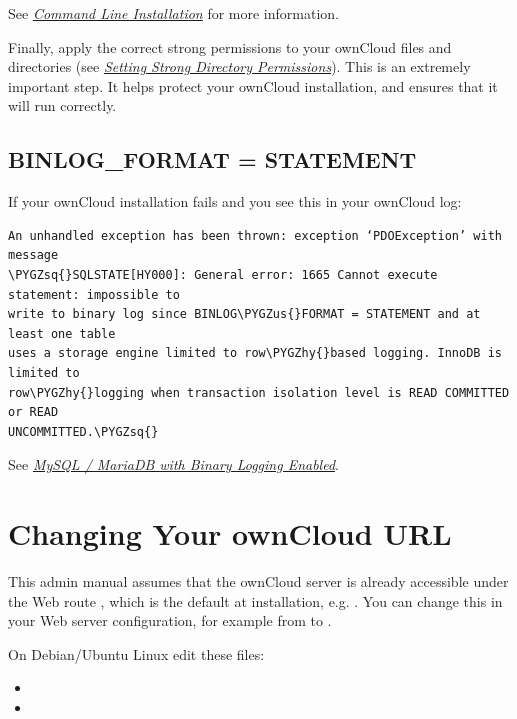\documentclass[letterpaper,10pt,english]{sphinxmanual}
\def\PYGZus{\char`\_}
\def\PYGZhy{\char`\-}
\def\PYGZsq{\char`\'}
\renewcommand\PYGZsq{\textquotesingle}
\begin{document}
See {\hyperref[configuration_server/occ_command:command\string-line\string-installation\string-label]{\emph{Command Line Installation}}} for more information.

Finally, apply the correct strong permissions to your ownCloud files and
directories (see {\hyperref[installation/installation_wizard:strong\string-perms\string-label]{\emph{Setting Strong Directory Permissions}}}). This is an extremely important
step. It helps protect your ownCloud installation, and ensures that it will run
correctly.


\subsection{BINLOG\_FORMAT = STATEMENT}
\label{installation/command_line_installation:binlog-format-statement}
If your ownCloud installation fails and you see this in your ownCloud log:

\begin{Verbatim}[commandchars=\\\{\}]
An unhandled exception has been thrown: exception ‘PDOException’ with message
\PYGZsq{}SQLSTATE[HY000]: General error: 1665 Cannot execute statement: impossible to
write to binary log since BINLOG\PYGZus{}FORMAT = STATEMENT and at least one table
uses a storage engine limited to row\PYGZhy{}based logging. InnoDB is limited to
row\PYGZhy{}logging when transaction isolation level is READ COMMITTED or READ
UNCOMMITTED.\PYGZsq{}
\end{Verbatim}

See {\hyperref[configuration_database/linux_database_configuration:db\string-binlog\string-label]{\emph{MySQL / MariaDB with Binary Logging Enabled}}}.


\section{Changing Your ownCloud URL}
\label{installation/changing_the_web_route::doc}\label{installation/changing_the_web_route:changing-your-owncloud-url}
This admin manual assumes that the ownCloud server is already accessible under the Web route
, which is the default at installation, e.g. . You can change this in your Web server configuration, for example from  to .

On Debian/Ubuntu Linux edit these files:
\begin{itemize}
\item {} 

\item {} 

\end{itemize}
\end{document}
